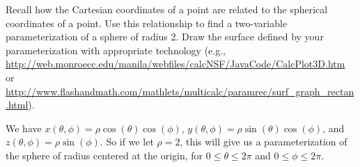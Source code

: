 \begin{activity} \label{A:11.6.1} Recall how the Cartesian coordinates of a point are related to the spherical coordinates of a point. Use this relationship to find a two-variable parameterization of a sphere of radius 2. Draw the surface defined by your parameterization with appropriate technology (e.g., \url{http://web.monroecc.edu/manila/webfiles/calcNSF/JavaCode/CalcPlot3D.htm} or \url{http://www.flashandmath.com/mathlets/multicalc/paramrec/surf_graph_rectan.html}).



\end{activity}
\begin{smallhint}

\end{smallhint}
\begin{bighint}

\end{bighint}
\begin{activitySolution}
We have $x(\theta,\phi) = \rho \cos(\theta) \cos(\phi)$, $y(\theta,\phi) = \rho \sin(\theta) \cos(\phi)$, and $z(\theta,\phi) = \rho \sin(\phi)$. So if we let $\rho = 2$, this will give us a parameterization of the sphere of radius centered at the origin, for $0 \leq \theta \leq 2\pi$ and $0 \leq \phi \leq 2\pi$.

\end{activitySolution}
\aftera
